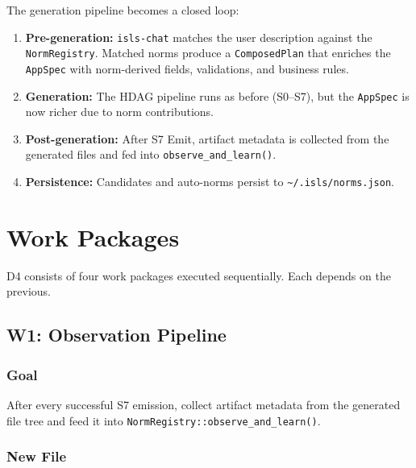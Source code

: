 \documentclass[11pt,a4paper]{article}
\begin{document}
The generation pipeline becomes a closed loop:

\begin{enumerate}[nosep]
\item \textbf{Pre-generation:} \texttt{isls-chat} matches the user 
      description against the \texttt{NormRegistry}. Matched norms produce 
      a \texttt{ComposedPlan} that enriches the \texttt{AppSpec} with 
      norm-derived fields, validations, and business rules.
\item \textbf{Generation:} The HDAG pipeline runs as before (S0--S7), 
      but the \texttt{AppSpec} is now richer due to norm contributions.
\item \textbf{Post-generation:} After S7 Emit, artifact metadata is 
      collected from the generated files and fed into 
      \texttt{observe\_and\_learn()}.
\item \textbf{Persistence:} Candidates and auto-norms persist to 
      \texttt{\textasciitilde/.isls/norms.json}.
\end{enumerate}


\section{Work Packages}

D4 consists of four work packages executed sequentially. Each depends on 
the previous.

\subsection{W1: Observation Pipeline}
\label{sec:w1}

\subsubsection{Goal}

After every successful S7 emission, collect artifact metadata from the 
generated file tree and feed it into \texttt{NormRegistry::observe\_and\_learn()}.

\subsubsection{New File}
\end{document}
